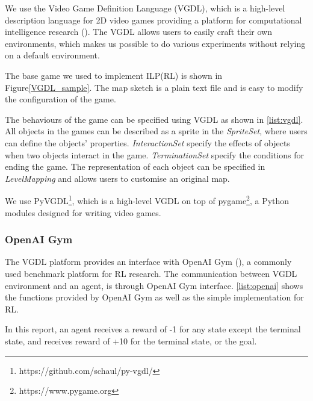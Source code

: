 We use the Video Game Definition Language (VGDL), which is a high-level description language for 2D video games providing a platform for computational intelligence research (\cite{Schaul2013}).
The VGDL allows users to easily craft their own environments, 
which makes us possible to do various experiments without relying on a default environment.

The base game we used to implement ILP(RL) is shown in Figure\ref{VGDL_sample}.
The map sketch is a plain text file and is easy to modify the configuration of the game.



The behaviours of the game can be specified using VGDL as shown in \ref{list:vgdl}. 
All objects in the games can be described as a sprite in the \textit{SpriteSet}, where users can define the objects' properties.
\textit{InteractionSet} specify the effects of objects when two objects interact in the game.
\textit{TerminationSet} specify the conditions for ending the game.
The representation of each object can be specified in \textit{LevelMapping} and allows users to customise an original map.

We use PyVGDL\footnote{https://github.com/schaul/py-vgdl/}, which is a high-level VGDL on top of pygame\footnote{https://www.pygame.org}, 
a Python modules designed for writing video games.

\subsubsection{OpenAI Gym}
The VGDL platform provides an interface with OpenAI Gym (\cite{Brockman2016}), a commonly used benchmark platform for RL research.
The communication between VGDL environment and an agent, is through OpenAI Gym interface. 
\ref{list:openai} shows the functions provided by OpenAI Gym as well as the simple implementation for RL. 

In this report, an agent receives a reward of -1 for any state except the terminal state, and receives reward of +10 for the terminal state, or the goal.




